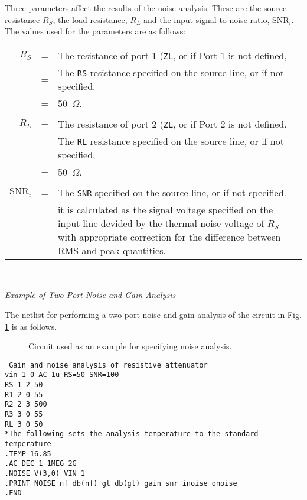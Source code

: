Three parameters affect the results of the noise analysis.  These are the
source resistance $R_S$, the load resistance, $R_L$ and the input signal to
noise ratio, $\mbox{SNR}_i$.  The values used for the parameters are as follows:
\\\offset
\begin{tabular}{rcp{4in}}
$R_S$ &=& The resistance of port 1 ({\tt ZL}, or if Port 1 is not defined,\\
      &=& The {\tt RS} resistance specified on the source line, or if not
          specified.\\
      &=& 50~$\Omega$.\\
\\
$R_L$ &=& The resistance of port 2 ({\tt ZL}, or if Port 2  is not defined.\\
      &=& The {\tt RL} resistance specified on the source line, or if not
          specified,\\
      &=& 50~$\Omega$.\\
      \\
$\mbox{SNR}_i$ &=& The {\tt SNR} specified on the source line, or if not
             specified.\\
      &=& it is calculated as the signal voltage specified on the input line
          devided by the thermal noise voltage of $R_S$ with appropriate
          correction for the difference between RMS and peak quantities.\\
\end{tabular}
\\\offset

\noindent
{\it Example of Two-Port Noise and Gain Analysis}

The netlist for performing a two-port noise and gain analysis of the circuit 
in Fig. \ref{fig:noiser} is as follows.
\begin{figure}
\centerline{\epsfxsize=3in}
\caption{Circuit used as an example for specifying noise analysis.
\label{fig:noiser}}
\end{figure}

{\tt
\noindent
Gain and noise analysis of resistive attenuator\\
vin 1 0 AC 1u RS=50 SNR=100\\
RS 1 2 50\\
R1 2 0 55\\
R2 2 3 500\\
R3 3 0 55\\
RL 3 0 50\\
*The following sets the analysis temperature to the standard temperature\\
.TEMP 16.85\\
.AC DEC 1 1MEG 2G\\
.NOISE V(3,0) VIN 1\\
.PRINT NOISE nf db(nf) gt db(gt) gain snr inoise onoise\\
.END}

